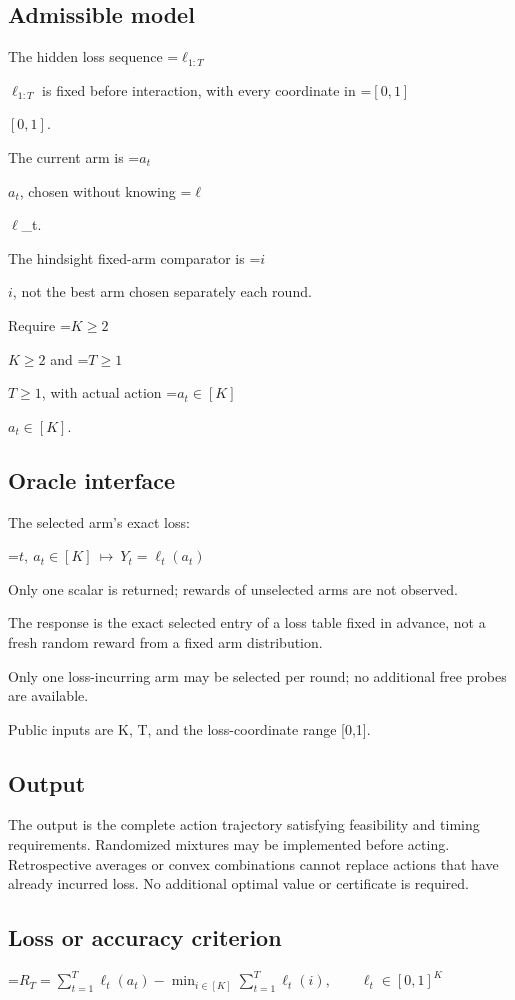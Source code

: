 \documentclass[10pt,a4paper]{article}
\newcommand{\AtlasMath}[1]{\par\begingroup\centering\setbox0=\hbox{$\displaystyle #1$}\ifdim\wd0>1.4\linewidth\typeout{ATLAS WIDE FORMULA: \the\wd0}\fi\ifdim\wd0>\linewidth\resizebox{\linewidth}{!}{\box0}\else\box0\fi\par\endgroup}
\newcommand{\AtlasInlineMath}[1]{\begingroup\setbox0=\hbox{$#1$}\ifdim\wd0>.4\linewidth\endgroup\AtlasMath{#1}\else\endgroup$#1$\fi}
\begin{document}
\subsection{Admissible model}
The hidden loss sequence \AtlasInlineMath{\ell_{1:T}} is fixed before interaction, with every coordinate in \AtlasInlineMath{[0,1]}.

The current arm is \AtlasInlineMath{a_t}, chosen without knowing \AtlasInlineMath{\ell}\_t.

The hindsight fixed-arm comparator is \AtlasInlineMath{i}, not the best arm chosen separately each round.

Require \AtlasInlineMath{K\ge2} and \AtlasInlineMath{T\ge1}, with actual action \AtlasInlineMath{a_t\in[K]}.

\subsection{Oracle interface}
The selected arm’s exact loss:


\AtlasMath{t,\ a_t\in[K]\ \longmapsto\ Y_t=\ell_t(a_t)}


Only one scalar is returned; rewards of unselected arms are not observed.

The response is the exact selected entry of a loss table fixed in advance, not a fresh random reward from a fixed arm distribution.

Only one loss-incurring arm may be selected per round; no additional free probes are available.

Public inputs are K, T, and the loss-coordinate range [0,1].

\subsection{Output}
The output is the complete action trajectory satisfying feasibility and timing requirements. Randomized mixtures may be implemented before acting. Retrospective averages or convex combinations cannot replace actions that have already incurred loss. No additional optimal value or certificate is required.

\subsection{Loss or accuracy criterion}

\AtlasMath{R_T=\sum_{t=1}^T\ell_t(a_t)-\min_{i\in[K]}\sum_{t=1}^T\ell_t(i),\qquad \ell_t\in[0,1]^K}
\end{document}
